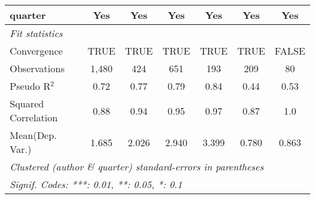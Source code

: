 \begin{tabular}{lcccccc}
   quarter                                                    & Yes           & Yes           & Yes          & Yes         & Yes          & Yes\\  
   \midrule
   \emph{Fit statistics}\\
   Convergence                                                &TRUE           & TRUE          & TRUE         & TRUE        & TRUE         & FALSE\\  
   Observations                                               & 1,480         & 424           & 651          & 193         & 209          & 80\\  
   Pseudo R$^2$                                               & 0.72          & 0.77          & 0.79         & 0.84        & 0.44         & 0.53\\  
   Squared Correlation                                        & 0.88          & 0.94          & 0.95         & 0.97        & 0.87         & 1.0\\  
Mean(Dep. Var.) & 1.685 & 2.026 & 2.940 & 3.399 & 0.780 & 0.863 \\
   \midrule \midrule
   \multicolumn{7}{l}{\emph{Clustered (author \& quarter) standard-errors in parentheses}}\\
   \multicolumn{7}{l}{\emph{Signif. Codes: ***: 0.01, **: 0.05, *: 0.1}}\\
\end{tabular}
\par\endgroup

